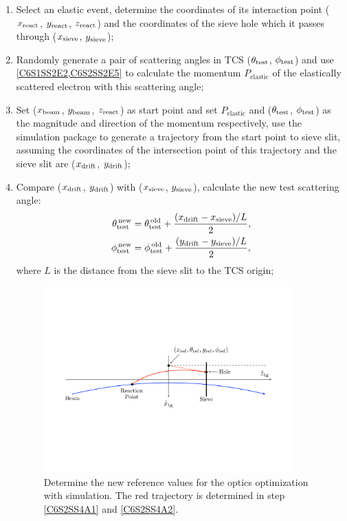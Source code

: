 \begin{enumerate}[parsep=0pt]
\item Select an elastic event, determine the coordinates of its interaction point ($x_{\mathrm{react}}$, $y_{\mathrm{react}}$, $z_{\mathrm{react}}$) and the coordinates of the sieve hole which it passes through ($x_{\mathrm{sieve}}$, $y_{\mathrm{sieve}}$);
\item Randomly generate a pair of scattering angles in TCS ($\theta_{\mathrm{test}}$, $\phi_{\mathrm{test}}$) and use \cref{C6S1SS2E2,C6S2SS2E5} to calculate the momentum $P_{\mathrm{elastic}}$ of the elastically scattered electron with this scattering angle;
\item \label{C6S2SS4A1} Set ($x_{\mathrm{beam}}$, $y_{\mathrm{beam}}$, $z_{\mathrm{react}}$) as start point and set $P_{\mathrm{elastic}}$ and ($\theta_{\mathrm{test}}$, $\phi_{\mathrm{test}}$) as the magnitude and direction of the momentum respectively, use the simulation package to generate a trajectory from the start point to sieve slit, assuming the coordinates of the intersection point of this trajectory and the sieve slit are ($x_{\mathrm{drift}}$, $y_{\mathrm{drift}}$);
\item \label{C6S2SS4A2} Compare ($x_{\mathrm{drift}}$, $y_{\mathrm{drift}}$) with ($x_{\mathrm{sieve}}$, $y_{\mathrm{sieve}}$), calculate the new test scattering angle:
\begin{align} \label{C6S2SS4E1}
\theta_{\mathrm{test}}^{\,\mathrm{new}} & = \theta_{\mathrm{test}}^{\,\mathrm{old}}+\frac{(x_{\mathrm{drift}}-x_{\mathrm{sieve}})/L}{2}, \\ \label{C6S2SS4E2}
\phi_{\mathrm{test}}^{\,\mathrm{new}} & = \phi_{\mathrm{test}}^{\,\mathrm{old}}+\frac{(y_{\mathrm{drift}}-y_{\mathrm{sieve}})/L}{2},
\end{align}
where $L$ is the distance from the sieve slit to the TCS origin;

\begin{figure}[tb!]
  \centering
  \includegraphics[width=0.9\textwidth]{figs/optics-reference-value.pdf}
  \caption[Determine the new reference values for the optics optimization.]{Determine the new reference values for the optics optimization with simulation. The red trajectory is determined in step \ref{C6S2SS4A1} and \ref{C6S2SS4A2}. \label{C6S2SS4F1}}
\end{figure}


\end{enumerate}
